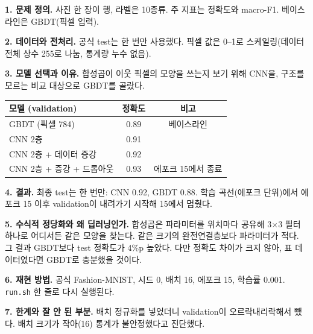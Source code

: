 \documentclass[11pt]{article}
\begin{document}


\noindent\textbf{1. 문제 정의.} 사진 한 장이 행, 라벨은 10종류. 주 지표는 정확도와 macro-F1. 베이스라인은 GBDT(픽셀 입력).

\noindent\textbf{2. 데이터와 전처리.} 공식 test는 한 번만 사용했다. 픽셀 값은 0--1로 스케일링(데이터 전체 상수 255로 나눔, 통계량 누수 없음).

\noindent\textbf{3. 모델 선택과 이유.} 합성곱이 이웃 픽셀의 모양을 쓰는지 보기 위해 CNN을, 구조를 모르는 비교 대상으로 GBDT를 골랐다.

\begin{center}\small
\begin{tabular}{@{}lcc@{}}\toprule
모델 (validation) & 정확도 & 비고 \\\midrule
GBDT (픽셀 784) & 0.89 & 베이스라인 \\
CNN 2층 & 0.91 & \\
CNN 2층 + 데이터 증강 & 0.92 & \\
CNN 2층 + 증강 + 드롭아웃 & 0.93 & 에포크 15에서 종료 \\\bottomrule
\end{tabular}
\end{center}

\noindent\textbf{4. 결과.} 최종 test는 한 번만: CNN 0.92, GBDT 0.88. 학습 곡선(에포크 단위)에서 에포크 15 이후 validation이 내려가기 시작해 15에서 멈췄다.

\noindent\textbf{5. 수식적 정당화와 왜 딥러닝인가.} 합성곱은 파라미터를 위치마다 공유해 3$\times$3 필터 하나로 어디서든 같은 모양을 찾는다. 같은 크기의 완전연결층보다 파라미터가 적다. 그 결과 GBDT보다 test 정확도가 4\%p 높았다. 다만 정확도 차이가 크지 않아, 표 데이터였다면 GBDT로 충분했을 것이다.

\noindent\textbf{6. 재현 방법.} 공식 Fashion-MNIST, 시드 0, 배치 16, 에포크 15, 학습률 0.001. \texttt{run.sh} 한 줄로 다시 실행된다.

\noindent\textbf{7. 한계와 잘 안 된 부분.} 배치 정규화를 넣었더니 validation이 오르락내리락해서 뺐다. 배치 크기가 작아(16) 통계가 불안정했다고 진단했다.
\end{document}
